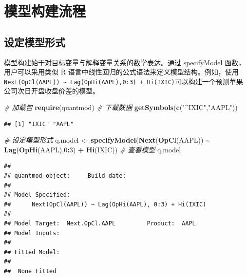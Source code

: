 \documentclass[]{ctexbook}
\newenvironment{Shaded}{\begin{snugshade}}{\end{snugshade}}
\newcommand{\CommentTok}[1]{\textcolor[rgb]{0.56,0.35,0.01}{\textit{#1}}}
\newcommand{\DecValTok}[1]{\textcolor[rgb]{0.00,0.00,0.81}{#1}}
\newcommand{\FunctionTok}[1]{\textcolor[rgb]{0.13,0.29,0.53}{\textbf{#1}}}
\newcommand{\NormalTok}[1]{#1}
\newcommand{\OtherTok}[1]{\textcolor[rgb]{0.56,0.35,0.01}{#1}}
\newcommand{\SpecialCharTok}[1]{\textcolor[rgb]{0.81,0.36,0.00}{\textbf{#1}}}
\newcommand{\StringTok}[1]{\textcolor[rgb]{0.31,0.60,0.02}{#1}}
\begin{document}
\section{模型构建流程}\label{ux6a21ux578bux6784ux5efaux6d41ux7a0b}

\subsection{设定模型形式}\label{ux8bbeux5b9aux6a21ux578bux5f62ux5f0f}

模型构建始于对目标变量与解释变量关系的数学表达。通过 specifyModel 函数，用户可以采用类似 R 语言中线性回归的公式语法来定义模型结构。例如，使用 \texttt{Next(OpCl(AAPL))\ \textasciitilde{}\ Lag(OpHi(AAPL),0:3)\ +\ Hi(IXIC)}可以构建一个预测苹果公司次日开盘收盘价差的模型。

\begin{Shaded}
\begin{Highlighting}[]
\CommentTok{\# 加载包}
\FunctionTok{require}\NormalTok{(quantmod)}
\CommentTok{\# 下载数据}
\FunctionTok{getSymbols}\NormalTok{(}\FunctionTok{c}\NormalTok{(}\StringTok{"\^{}IXIC"}\NormalTok{,}\StringTok{"AAPL"}\NormalTok{))}
\end{Highlighting}
\end{Shaded}

\begin{verbatim}
## [1] "IXIC" "AAPL"
\end{verbatim}

\begin{Shaded}
\begin{Highlighting}[]
\CommentTok{\# 设定模型形式}
\NormalTok{q.model }\OtherTok{\textless{}{-}} \FunctionTok{specifyModel}\NormalTok{(}\FunctionTok{Next}\NormalTok{(}\FunctionTok{OpCl}\NormalTok{(AAPL)) }\SpecialCharTok{\textasciitilde{}} \FunctionTok{Lag}\NormalTok{(}\FunctionTok{OpHi}\NormalTok{(AAPL),}\DecValTok{0}\SpecialCharTok{:}\DecValTok{3}\NormalTok{) }\SpecialCharTok{+} \FunctionTok{Hi}\NormalTok{(IXIC))}
\CommentTok{\# 查看模型}
\NormalTok{q.model}
\end{Highlighting}
\end{Shaded}

\begin{verbatim}
## 
## quantmod object:     Build date:   
## 
## Model Specified: 
##      Next(OpCl(AAPL)) ~ Lag(OpHi(AAPL), 0:3) + Hi(IXIC) 
## 
## Model Target:  Next.OpCl.AAPL         Product:  AAPL 
## Model Inputs:   
## 
## Fitted Model: 
## 
##  None Fitted
\end{verbatim}
\end{document}
